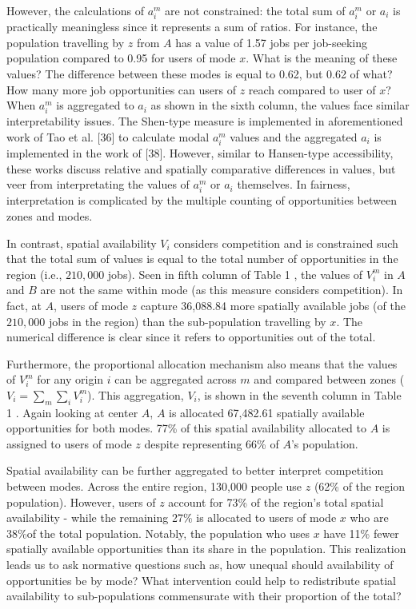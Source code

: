 \documentclass[10pt,letterpaper]{article}
\begin{document}
However, the calculations of \(a_i^m\) are not constrained: the total
sum of \(a_i^m\) or \(a_i\) is practically meaningless since it
represents a sum of ratios. For instance, the population travelling by
\(z\) from \(A\) has a value of 1.57 jobs per job-seeking population
compared to 0.95 for users of mode \(x\). What is the meaning of these
values? The difference between these modes is equal to 0.62, but 0.62 of
what? How many more job opportunities can users of \(z\) reach compared
to user of \(x\)? When \(a_i^m\) is aggregated to \(a_i\) as shown in
the sixth column, the values face similar interpretability issues. The
Shen-type measure is implemented in aforementioned work of Tao et al.
{[}36{]} to calculate modal \(a_i^m\) values and the aggregated \(a_i\)
is implemented in the work of {[}38{]}. However, similar to Hansen-type
accessibility, these works discuss relative and spatially comparative
differences in values, but veer from interpretating the values of
\(a_i^m\) or \(a_i\) themselves. In fairness, interpretation is
complicated by the multiple counting of opportunities between zones and
modes.

In contrast, spatial availability \(V_i\) considers competition and is
constrained such that the total sum of values is equal to the total
number of opportunities in the region (i.e., \(210,000\) jobs). Seen in
fifth column of Table 1 , the values of \(V_i^m\) in \(A\) and \(B\) are
not the same within mode (as this measure considers competition). In
fact, at \(A\), users of mode \(z\) capture 36,088.84 more spatially
available jobs (of the \(210,000\) jobs in the region) than the
sub-population travelling by \(x\). The numerical difference is clear
since it refers to opportunities out of the total.

Furthermore, the proportional allocation mechanism also means that the
values of \(V_i^m\) for any origin \(i\) can be aggregated across \(m\)
and compared between zones (\(V_i = \sum_m{\sum_i{V_i^m}}\)). This
aggregation, \(V_i\), is shown in the seventh column in Table 1 . Again
looking at center \(A\), \(A\) is allocated 67,482.61 spatially
available opportunities for both modes. 77\% of this spatial
availability allocated to \(A\) is assigned to users of mode \(z\)
despite representing 66\% of \(A\)'s population.

Spatial availability can be further aggregated to better interpret
competition between modes. Across the entire region, 130,000 people use
\(z\) (62\% of the region population). However, users of \(z\) account
for 73\% of the region's total spatial availability - while the
remaining 27\% is allocated to users of mode \(x\) who are 38\%of the
total population. Notably, the population who uses \(x\) have 11\% fewer
spatially available opportunities than its share in the population. This
realization leads us to ask normative questions such as, how unequal
should availability of opportunities be by mode? What intervention could
help to redistribute spatial availability to sub-populations
commensurate with their proportion of the total?
\end{document}
